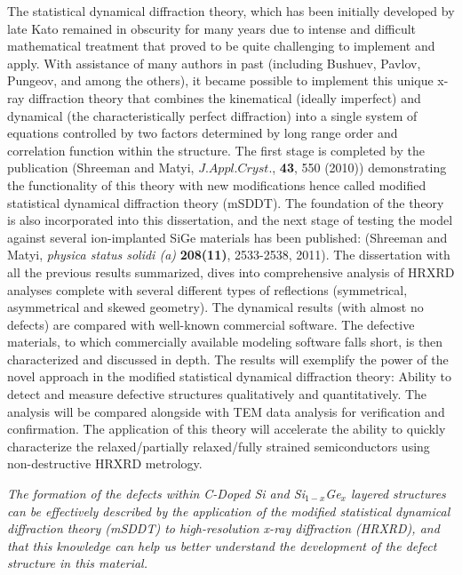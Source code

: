 The statistical dynamical diffraction theory, which has been initially developed by late Kato remained in obscurity for many years due to intense and difficult mathematical treatment that proved to be quite challenging to implement and apply.  With assistance of many authors in past (including Bushuev, Pavlov, Pungeov, and among the others), it became possible to implement this unique x-ray diffraction theory that combines the kinematical (ideally imperfect) and dynamical (the characteristically perfect diffraction) into a single system of equations controlled by two factors determined by long range order and correlation function within the structure.  The first stage is completed by the publication (Shreeman and Matyi, $J. Appl. Cryst.$, {\textbf{43}}, 550 (2010)) demonstrating the functionality of this theory with new modifications hence called modified statistical dynamical diffraction theory (mSDDT).  The foundation of the theory is also incorporated into this dissertation, and the next stage of testing the model against several ion-implanted SiGe materials has been published: (Shreeman and Matyi, {\textit{physica status solidi (a)}} {\textbf{208(11)}}, 2533-2538, 2011).  The dissertation with all the previous results summarized, dives into comprehensive analysis of HRXRD analyses complete with several different types of reflections (symmetrical, asymmetrical and skewed geometry). The dynamical results (with almost no defects) are compared  with well-known commercial software.  The defective materials, to which commercially available modeling software falls short, is then characterized and discussed in depth.  The results will exemplify the power of the novel approach in the modified statistical dynamical diffraction theory:  Ability to detect and measure defective structures qualitatively and quantitatively.  The analysis will be compared alongside with TEM data analysis for verification and confirmation.  The application of this theory will accelerate the ability to quickly characterize the relaxed/partially relaxed/fully strained semiconductors using non-destructive HRXRD metrology.




\cnsethesis
{\centering%
\emph{The formation of the defects within C-Doped Si and Si$_{1-x}$Ge$_{x}$ layered structures can be effectively described by the application of the modified statistical dynamical diffraction theory (mSDDT) to high-resolution x-ray diffraction (HRXRD), and that this knowledge can help us better understand the development of the defect structure in this material.
}}


